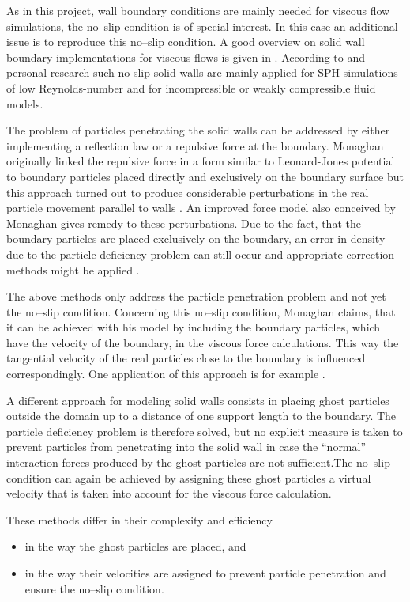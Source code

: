 \documentclass[11pt,a4paper,twoside]{report}
\begin{document}
As in this project, wall boundary conditions are mainly needed for viscous flow simulations, the no--slip condition is of special interest. In this case an additional issue is to reproduce this no--slip condition. A good overview on solid wall boundary implementations for viscous flows is given in \cite{Yildiz2009}. 
According to \cite{Yildiz2009} and personal research such no-slip solid walls are mainly applied for SPH-simulations of low Reynolds-number and for incompressible or weakly compressible fluid models. 

The problem of particles penetrating the solid walls can be addressed by either implementing a reflection law or a repulsive force at the boundary. Monaghan originally linked the repulsive force in a form similar to Leonard-Jones potential to boundary particles placed directly and exclusively on the boundary surface \cite{Monaghan1994} but this approach turned out to produce considerable perturbations in the real particle movement parallel to walls \cite{Monaghan2005}. An improved  force model also conceived by Monaghan \cite{Monaghan2003} gives remedy to these perturbations. Due to the fact, that the boundary particles are placed exclusively on the boundary, an error in density due to the particle deficiency problem can still occur and appropriate correction methods might be applied \cite{Monaghan2003}.

The above methods only address the particle penetration problem and not yet the no--slip condition. Concerning this no--slip condition, Monaghan claims, that it can be achieved with his model by including the boundary particles, which have the velocity of the boundary, in the viscous force calculations. This way the tangential velocity of the real particles close to the boundary is influenced correspondingly. One application of this approach is for example \cite{Cleary2002}. 

A different approach for modeling solid walls consists in placing ghost particles outside the domain up to a distance of one support length to the boundary. The particle deficiency problem is therefore solved, but no explicit measure is taken to prevent particles from penetrating into the solid wall in case the ``normal'' interaction forces produced by the ghost particles are not sufficient.The no--slip condition can again be achieved by assigning these ghost particles a virtual velocity that is taken into account for the viscous force calculation.

These methods differ in their complexity and efficiency 
\begin{itemize}
  \item in the way the ghost particles are placed, and
\item in the way their velocities are assigned to prevent particle penetration and ensure the no--slip condition.
 \end{itemize}
\end{document}
